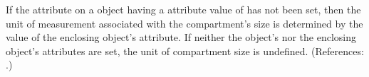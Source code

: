If the attribute  on a \Compartment object having a
 attribute value of  has not been set, then
the unit of measurement associated with the compartment's size is
determined by the value of the enclosing \Model object's 
attribute.  If neither the \Compartment object's  nor the
enclosing \Model object's  attributes are set, the unit of
compartment size is undefined.  (References: .)
